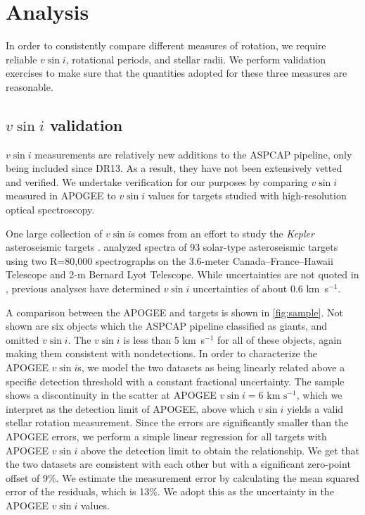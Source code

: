 \documentclass[manuscript]{aastex6}
\newcommand{\vsini}{\ensuremath{v \sin i}}
\newcommand{\Kepler}{\mbox{\textit{Kepler}}}
\newcommand{\kms}{\textrm{ km~s}\ensuremath{^{-1}}}
\begin{document}
\section{Analysis}
\label{sec:analysis}

In order to consistently compare different measures of rotation, we require 
reliable \vsini{}, rotational periods, and stellar radii. We perform validation
exercises to make sure that the quantities adopted for these three measures are 
reasonable.


\subsection{\vsini{} validation}
\label{sec:vsini_check}

\vsini{} measurements are relatively new additions to the ASPCAP pipeline, only
being included since DR13. As a result, they have not been extensively vetted and 
verified. We undertake verification for our purposes by comparing \vsini{} 
measured in APOGEE to \vsini{} values for
targets studied with high-resolution optical spectroscopy. 

One large collection of \vsini{}s comes from an effort to study the
\Kepler{} asteroseismic targets \citep{Bruntt12}. \citet{Bruntt12} analyzed 
spectra of 93 solar-type asteroseismic targets using two R=80,000 spectrographs 
on the 3.6-meter Canada--France--Hawaii Telescope and 2-m Bernard Lyot
Telescope. While uncertainties are not quoted in \citet{Bruntt12},
previous analyses have determined \vsini{} uncertainties of about 0.6
\kms \citep{Bruntt10a,Bruntt10b}.

A comparison between the APOGEE and \citet{Bruntt12} targets is shown in
\cref{fig:sample}. Not shown are six
objects which the ASPCAP pipeline classified as giants, and omitted
\vsini{}. The \citet{Bruntt12} \vsini{} is less than 5
\kms{} for all of these objects, again making them consistent with nondetections.
In order to characterize the APOGEE \vsini{}s, we model the two datasets as
being linearly related above a specific detection threshold with a constant
fractional uncertainty. The sample shows a 
discontinuity in the scatter at APOGEE \(\vsini=6\kms\), which we 
interpret as the detection limit of APOGEE, above which \vsini{} yields a valid 
stellar rotation measurement. Since the \citet{Bruntt12} errors are
significantly smaller than the APOGEE errors, we perform a simple linear
regression for all targets with APOGEE \vsini{} above the detection limit to
obtain the relationship. We get that the two datasets are consistent with each
other but with a significant zero-point offset of 9\%. We estimate the
measurement error by calculating the mean squared error of the residuals, which
is 13\%. We adopt this as the uncertainty in the APOGEE \vsini{} values.
\end{document}
